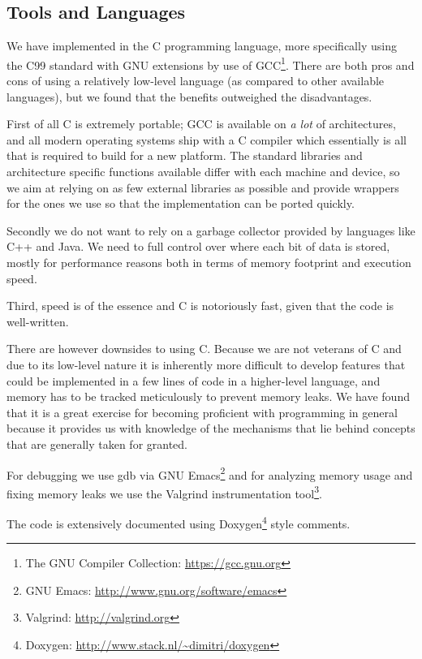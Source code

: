 \subsection{Tools and Languages}

We have implemented \thename{} in the C programming language, more specifically
using the C99 standard with GNU extensions by use of GCC\footnote{The GNU
  Compiler Collection: \url{https://gcc.gnu.org}}. There are both pros and cons
of using a relatively low-level language (as compared to other available
languages), but we found that the benefits outweighed the disadvantages.

First of all C is extremely portable; GCC is available on \textit{a lot} of
architectures, and all modern operating systems ship with a C compiler which
essentially is all that is required to build \thename{} for a new platform. The
standard libraries and architecture specific functions available differ with
each machine and device, so we aim at relying on as few external libraries as
possible and provide wrappers for the ones we use so that the implementation can
be ported quickly.

Secondly we do not want to rely on a garbage collector provided by languages
like C++ and Java. We need to full control over where each bit of data is
stored, mostly for performance reasons both in terms of memory footprint and
execution speed.

Third, speed is of the essence and C is notoriously fast, given that the code is
well-written.

There are however downsides to using C. Because we are not veterans of C and due
to its low-level nature it is inherently more difficult to develop features that
could be implemented in a few lines of code in a higher-level language, and
memory has to be tracked meticulously to prevent memory leaks. We have found
that it is a great exercise for becoming proficient with programming in general
because it provides us with knowledge of the mechanisms that lie behind concepts
that are generally taken for granted.

For debugging we use gdb via GNU Emacs\footnote{GNU Emacs:
  \url{http://www.gnu.org/software/emacs}} and for analyzing memory usage and
fixing memory leaks we use the Valgrind instrumentation tool\footnote{Valgrind:
  \url{http://valgrind.org}}.

The code is extensively documented using Doxygen\footnote{Doxygen:
  \url{http://www.stack.nl/~dimitri/doxygen}} style comments.

